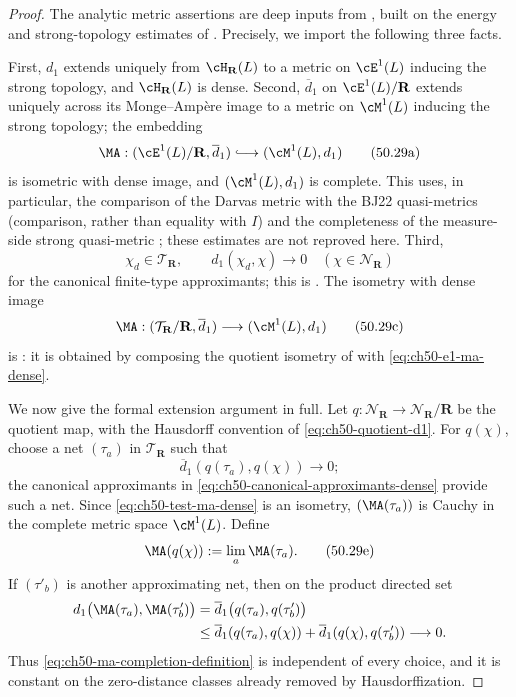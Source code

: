 \begin{proof}
The analytic metric assertions are deep inputs from
\cite[Theorem~B and Theorems~5.5, 5.11]{BJKS1}, built on the energy and
strong-topology estimates of \cite{BJ22}.  Precisely, we import the
following three facts.

First, $d_1$ extends uniquely from $\cH_{\mathbf R}(L)$ to a metric on
$\cE^1(L)$ inducing the strong topology, and
$\cH_{\mathbf R}(L)$ is dense.  Second, $\overline d_1$ on
$\cE^1(L)/\mathbf R$ extends uniquely across its Monge--Amp\`ere image to
a metric on $\cM^1(L)$ inducing the strong topology; the embedding
\[
\label{eq:ch50-e1-ma-dense}
 \MA:(\cE^1(L)/\mathbf R,\overline d_1)
 \lhook\joinrel\longrightarrow(\cM^1(L),d_1)
\tag{50.29a}
\]
is isometric with dense image, and $(\cM^1(L),d_1)$ is complete.  This
uses, in particular, the comparison of the Darvas metric with the BJ22
quasi-metrics (comparison, rather than equality with $I$) and the
completeness of the measure-side strong quasi-metric
\cite[Theorems~10.12 and~10.14]{BJ22}; these estimates are not reproved
here.  Third,
\[
\label{eq:ch50-canonical-approximants-dense}
 \chi_d\in\mathcal T_{\mathbf R},
 \qquad d_1(\chi_d,\chi)\longrightarrow0
 \quad(\chi\in\mathcal N_{\mathbf R})
\tag{50.29b}
\]
for the canonical finite-type approximants; this is
\cite[Theorem~3.18]{BJKS1}.  The isometry with dense image
\[
\label{eq:ch50-test-ma-dense}
 \MA:(\mathcal T_{\mathbf R}/\mathbf R,\overline d_1)
 \longrightarrow(\cM^1(L),d_1)
\tag{50.29c}
\]
is \cite[Lemma~7.1]{BJKS1}: it is obtained by composing the quotient
isometry of  with
\eqref{eq:ch50-e1-ma-dense}.

We now give the formal extension argument in full.  Let
$q:\mathcal N_{\mathbf R}\to\mathcal N_{\mathbf R}/\mathbf R$ be the quotient map,
with the Hausdorff convention of \eqref{eq:ch50-quotient-d1}.  For
$q(\chi)$, choose a net $(\tau_a)$ in $\mathcal T_{\mathbf R}$ such that
\[
\label{eq:ch50-norm-approximating-net}
 \overline d_1(q(\tau_a),q(\chi))\longrightarrow0;
\tag{50.29d}
\]
the canonical approximants in
\eqref{eq:ch50-canonical-approximants-dense} provide such a net.  Since
\eqref{eq:ch50-test-ma-dense} is an isometry, $(\MA(\tau_a))$ is Cauchy
in the complete metric space $\cM^1(L)$.  Define
\[
\label{eq:ch50-ma-completion-definition}
 \MA(q(\chi)):=\lim_a\MA(\tau_a).
\tag{50.29e}
\]
If $(\tau'_b)$ is another approximating net, then on the product directed
set
\begin{align*}
 d_1\bigl(\MA(\tau_a),\MA(\tau'_b)\bigr)
 &=\overline d_1\bigl(q(\tau_a),q(\tau'_b)\bigr)\\
 &\leq\overline d_1(q(\tau_a),q(\chi))
     +\overline d_1(q(\chi),q(\tau'_b))\longrightarrow0.
\end{align*}
Thus \eqref{eq:ch50-ma-completion-definition} is independent of every
choice, and it is constant on the zero-distance classes already removed by
Hausdorffization.


\end{proof}
